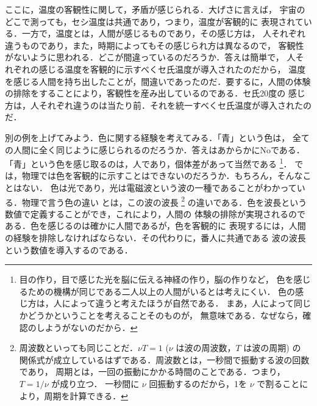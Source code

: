                 ここに，温度の客観性に関して，矛盾が感じられる．大げさに言えば，
                宇宙のどこで測っても，セシ温度は共通であり，つまり，温度が客観的に
                表現されている．一方で，温度とは，人間が感じるものであり，その感じ方は，
                人それぞれ違うものであり，また，時期によってもその感じられ方は異なるので，
                客観性がないように思われる．どこが間違っているのだろうか．答えは簡単で，
                人それぞれの感じる温度を客観的に示すべくセ氏温度が導入されたのだから，
                温度を感じる人間を持ち出したことが，間違いであったのだ．要するに，人間の体験
                の排除をすることにより，客観性を産み出しているのである．セ氏20度の
                感じ方は，人それぞれ違うのは当たり前．それを統一すべくセ氏温度が導入されたのだ．

                別の例を上げてみよう．色に関する経験を考えてみる．「青」という色は，
                全ての人間に全く同じように感じられるのだろうか．答えはあからかにNoである．
                「青」という色を感じ取るのは，人であり，個体差があって当然である
                    \footnote{
                        目の作り，目で感じた光を脳に伝える神経の作り，脳の作りなど，
                        色を感じるための機構が同じである二人以上の人間がいるとは考えにくい．
                        色の感じ方は，人によって違うと考えたほうが自然である．
                        まあ，人によって同じかどうかということを考えることそのものが，
                        無意味である．なぜなら，確認のしようがないのだから．
                    }．
                では，物理では色を客観的に示すことはできないのだろうか．もちろん，そんなことはない．
                色は光であり，光は電磁波という波の一種であることがわかっている．物理で言う色の違い
                とは，この波の波長
                    \footnote{
                        周波数といっても同じことだ．$\nu T = 1$ ($\nu$ は波の周波数，$T$ は波の周期) の
                        関係式が成立しているはずである．周波数とは，一秒間で振動する波の回数であり，
                        周期とは，一回の振動にかかる時間のことである．つまり，$T = 1/\nu$ が成り立つ．
                        一秒間に $\nu$ 回振動するのだから，1を $\nu$ で割ることにより，周期を計算できる．
                    }
                の違いである．色を波長という数値で定義することができ，これにより，人間の
                体験の排除が実現されるのである．色を感じるのは確かに人間であるが，色を客観的に
                表現するには，人間の経験を排除しなければならない．その代わりに，番人に共通である
                波の波長という数値を導入するのである．

